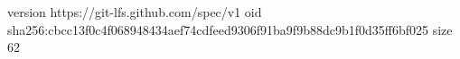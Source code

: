 version https://git-lfs.github.com/spec/v1
oid sha256:cbcc13f0c4f068948434aef74cdfeed9306f91ba9f9b88dc9b1f0d35ff6bf025
size 62
